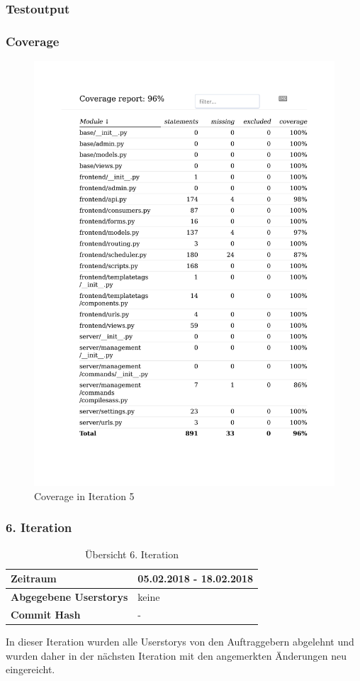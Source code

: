 \subsubsection{Testoutput }

\subsubsection{Coverage}
\begin{figure}[H]
	\centering
\includegraphics[width=.9\textwidth]{test_output/05_iteration_coverage.pdf}
	\caption{Coverage in Iteration 5}
\end{figure}

\subsubsection{6. Iteration}
\begin{table}[H]
\begin{center}
	\begin{tabular}{| l | l |}
		\hline
		\textbf{Zeitraum} &  05.02.2018 - 18.02.2018\\\hline
		\textbf{Abgegebene Userstorys} & keine\\\hline
		\textbf{Commit Hash} & - \\\hline
	\end{tabular}
	\caption{Übersicht 6. Iteration}
\end{center}
\end{table}
In dieser Iteration wurden alle Userstorys von den Auftraggebern abgelehnt und wurden daher in der nächsten Iteration mit
den angemerkten Änderungen neu eingereicht.

